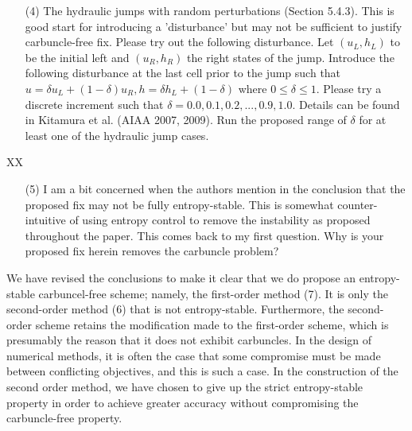 \documentclass[english,11pt]{article}
\begin{document}
\bigskip
{\color{red}
  \begin{itemize}
  \item[(4)]
    The hydraulic jumps with random perturbations (Section 5.4.3). This is good start for introducing a
    'disturbance' but may not be sufficient to justify carbuncle-free fix. Please try out the following
    disturbance. Let $(u_L, h_L)$ to be the initial left and $(u_R, h_R)$ the right states of the jump. 
    Introduce the following disturbance at the last cell prior to the jump such that 
    $u=\delta { u_L} + (1-\delta)u_R, h=\delta {h_L} + (1-\delta)$ where $0\leq{\delta}\leq{1}$. 
    Please try a discrete increment such that $\delta = 0.0, 0.1, 0.2,...,0.9, 1.0$. 
    Details can be found in Kitamura et al. (AIAA 2007, 2009). Run the proposed range of $\delta$
    for at least one of the hydraulic jump cases.
  \end{itemize}
}
\noindent
XX

\bigskip
{\color{red}
  \begin{itemize}
  \item[(5)]
    I am a bit concerned when the authors mention in the conclusion that the proposed fix may not be fully
    entropy-stable. This is somewhat counter-intuitive of using entropy control to remove the instability as
    proposed throughout the paper. This comes back to my first question. Why is your proposed fix herein
    removes the carbuncle problem?
  \end{itemize}
}
\noindent
We have revised the conclusions to make it clear that we do propose an entropy-stable carbuncel-free scheme;
namely, the first-order method (7).  It is only the second-order method (6) that is not entropy-stable.
Furthermore, the second-order scheme retains the modification made to the first-order scheme, which is
presumably the reason that it does not exhibit carbuncles.
In the design of numerical methods, it is often the case that some compromise must be made between conflicting
objectives, and this is such a case.  In the construction of the second order
method, we have chosen to give up the strict entropy-stable property in order
to achieve greater accuracy without compromising the carbuncle-free property.
\end{document}
